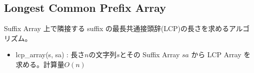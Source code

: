 \subsection{Longest Common Prefix Array}

Suffix Array 上で隣接する suffix の最長共通接頭辞(LCP)の長さを求めるアルゴリズム。

\begin{itemize}
    \item lcp\_array(s, sa) : 長さ$n$の文字列$s$とその Suffix Array $sa$ から LCP Array を求める。計算量$O(n)$
\end{itemize}


